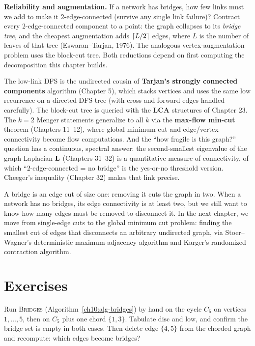 \begin{applicationbox}
\textbf{Reliability and augmentation.} If a network has bridges, how few links must we
add to make it $2$-edge-connected (survive any single link failure)? Contract every
$2$-edge-connected component to a point: the graph collapses to its \emph{bridge tree},
and the cheapest augmentation adds $\lceil L/2\rceil$ edges, where $L$ is the number of
leaves of that tree (Eswaran--Tarjan, 1976). The analogous vertex-augmentation problem
uses the block-cut tree. Both reductions depend on first computing the decomposition
this chapter builds.
\end{applicationbox}

\begin{connectionbox}
The low-link DFS is the undirected cousin of \textbf{Tarjan's strongly connected
components} algorithm (Chapter 5), which stacks vertices and uses the same
$\mathrm{low}$ recurrence on a directed DFS tree (with cross and forward edges handled
carefully). The block-cut tree is queried with the \textbf{LCA} structures of
Chapter 23. The $k=2$ Menger statements generalize to all $k$ via the
\textbf{max-flow min-cut} theorem (Chapters 11--12), where global minimum cut and
edge/vertex connectivity become flow computations. And the ``how fragile is this
graph?'' question has a continuous, spectral answer: the second-smallest eigenvalue of
the graph Laplacian $\mathbf{L}$ (Chapters 31--32) is a quantitative measure of
connectivity, of which ``$2$-edge-connected = no bridge'' is the yes-or-no threshold version.
Cheeger's inequality (Chapter 32) makes that link precise.
\end{connectionbox}

A bridge is an edge cut of size one: removing it cuts the graph in two.
When a network has no bridges, its edge connectivity is at least two, but we still want to know how many edges must be removed to disconnect it.
In the next chapter, we move from single-edge cuts to the global minimum cut problem: finding the smallest
cut of edges that disconnects an arbitrary undirected graph, via Stoer--Wagner's deterministic maximum-adjacency
algorithm and Karger's randomized contraction algorithm.

\section{Exercises}
\label{ch10:exercises}

\begin{exercise}
Run \textsc{Bridges} (Algorithm~\ref{ch10:alg-bridges}) by hand on the cycle $C_5$ on
vertices $1,\dots,5$, then on $C_5$ plus one chord $\{1,3\}$. Tabulate $\mathrm{disc}$
and $\mathrm{low}$, and confirm the bridge set is empty in both cases. Then delete edge
$\{4,5\}$ from the chorded graph and recompute: which edges become bridges?
\end{exercise}

